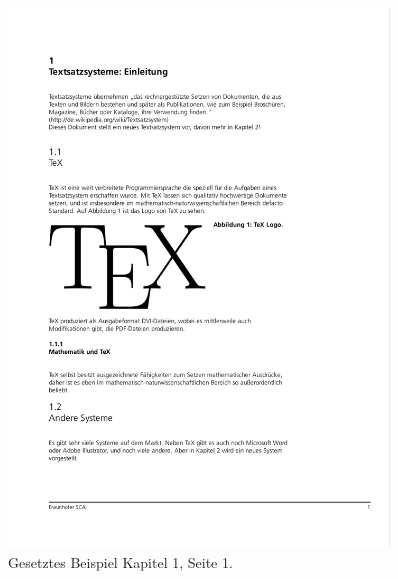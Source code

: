 \begin{figure}[h!]
  \centering
    \includegraphics[width=0.9\textwidth]{figures/dsl_skript_1.pdf}
  \caption{Gesetztes Beispiel Kapitel 1, Seite 1.}\label{fig-dsl_skript_1}
\end{figure}

